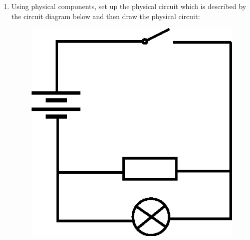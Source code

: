           \label{m38771*id63592}\begin{enumerate}[noitemsep, label=\textbf{\arabic*}. ] 
            \label{m38771*uid23}\item Using physical components, set up the physical circuit which is described by the circuit diagram below and then draw the physical circuit:

    \setcounter{subfigure}{0}


	\begin{figure}[H] %
    \begin{center}
    \label{m38771*id63611!!!underscore!!!media}\label{m38771*id63611!!!underscore!!!printimage}\includegraphics{col11305.imgs/m38771_PG10C9_014.png} %
        
      \vspace{2pt}
    \vspace{.1in}
    
    \end{center}

 \end{figure}   

    \addtocounter{footnote}{-0}
     

\end{enumerate}
